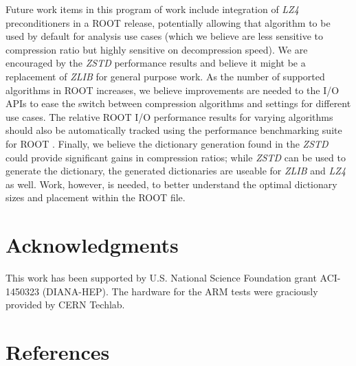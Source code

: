 \documentclass[12pt]{iopart}
\begin{document}
Future work items in this program of work include integration of \textit{LZ4} preconditioners in a ROOT release, potentially allowing that algorithm to be used by default for analysis use cases (which we believe are less sensitive to compression ratio but highly sensitive on decompression speed).  We are encouraged by the \textit{ZSTD} performance results and believe it might be a replacement of \textit{ZLIB} for general purpose work.  As the number of supported algorithms in ROOT increases, we believe improvements are needed to the I/O APIs to ease the switch between compression algorithms and settings for different use cases.  The relative ROOT I/O performance results for varying algorithms should also be automatically tracked using the performance benchmarking suite for ROOT \cite{rootbench}.  Finally, we believe the dictionary generation found in the \textit{ZSTD} could provide significant gains in compression ratios; while \textit{ZSTD} can be used to generate the dictionary, the generated dictionaries are useable for \textit{ZLIB} and \textit{LZ4} as well.  Work, however, is needed, to better understand the optimal dictionary sizes and placement within the ROOT file.

\section{Acknowledgments}

This work has been supported by U.S. National Science Foundation grant ACI-1450323 (DIANA-HEP).  The hardware for the ARM tests were graciously provided by CERN Techlab. 

\section{References}
\end{document}
